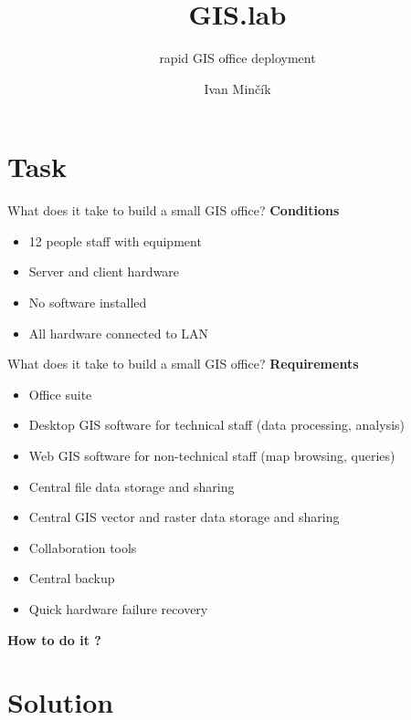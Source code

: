 \documentclass[12pt]{beamer}
\author{Ivan Minčík}
\title{GIS.lab}
\subtitle{rapid GIS office deployment}
\begin{document}
\begin{frame}
	\titlepage
\end{frame}


\section{Task}
\begin{frame}{What does it take to build a small GIS office?}
	\textbf{Conditions}
	\begin{itemize}
		\item 12 people staff with equipment
		\item Server and client hardware
		\item No software installed
		\item All hardware connected to LAN
	\end{itemize}
\end{frame}


\begin{frame}{What does it take to build a small GIS office?}
	\textbf{Requirements}
	\begin{itemize}[<+->]
		\item Office suite
		\item Desktop GIS software for technical staff (data processing, analysis)
		\item Web GIS software for non-technical staff (map browsing, queries)
		\item Central file data storage and sharing
		\item Central GIS vector and raster data storage and sharing
		\item Collaboration tools
		\item Central backup
		\item Quick hardware failure recovery
	\end{itemize}
\end{frame}


\begin{frame}
	\LARGE \textbf{How to do it ?}
\end{frame}


\section{Solution}
\end{document}
